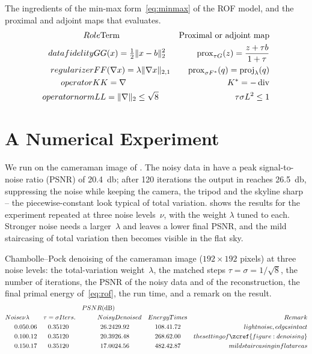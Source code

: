 \documentclass{article}
\begin{document}
	The ingredients of the min-max form~\eqref{eq:minmax} of the ROF model, and the proximal and adjoint maps that  evaluates.
	\begin{alignat}{3}
		Role & \text{Term} & \text{Proximal or adjoint map} \\
		data fidelity G   & G(x) = \tfrac12 \lVert x - b\rVert_2^2        & \operatorname{prox}_{\tau G}(z) = \dfrac{z + \tau b}{1 + \tau} \\
		regularizer F     & F(\nabla x) = \lambda \lVert\nabla x\rVert_{2,1} & \operatorname{prox}_{\sigma F^*}(q) = \operatorname{proj}_\lambda(q) \\
		operator K        & K = \nabla                             & K^* = -\operatorname{div} \\
		operator norm L   & L = \lVert\nabla\rVert_2 \le \sqrt{8}        & \tau \sigma L^2 \le 1 \\
	\end{alignat}
\section{A Numerical Experiment}
\label{section:experiment}
We run  on the cameraman image of .
The noisy data in  have a peak signal-to-noise ratio (PSNR) of \qty{20.4}{\decibel}; after \num{120} iterations the output in  reaches \qty{26.5}{\decibel}, suppressing the noise while keeping the camera, the tripod and the skyline sharp -- the piecewise-constant look typical of total variation.
 shows the results for the experiment repeated at three noise levels~$\nu$, with the weight $\lambda$ tuned to each.
Stronger noise needs a larger~$\lambda$ and leaves a lower final PSNR, and the mild staircasing of total variation then becomes visible in the flat sky.

	Chambolle--Pock denoising of the cameraman image ($192 \times 192$ pixels) at three noise levels: the total-variation weight~$\lambda$, the matched steps $\tau = \sigma = 1/\sqrt{8}$, the number of iterations, the PSNR of the noisy data and of the reconstruction, the final primal energy of~\eqref{eq:rof}, the run time, and a remark on the result.
	\begin{alignat}{7}
		& & & & PSNR (\unit{\decibel}) & & & \\
		{Noise \nu} & {\lambda} & {\tau = \sigma} & {Iters.} & {Noisy} & {Denoised} & {Energy} & {Time \unit{\second}} & {Remark} \\
		0.05 & 0.06 & 0.35 & 120 & 26.24 & 29.92 & 108.4 & 1.72 & light noise, edges intact \\
		0.10 & 0.12 & 0.35 & 120 & 20.39 & 26.48 & 268.6 & 2.00 & the setting of \zcref{figure:denoising} \\
		0.15 & 0.17 & 0.35 & 120 & 17.00 & 24.56 & 482.4 & 2.87 & mild staircasing in flat areas \\
	\end{alignat}
\end{document}
